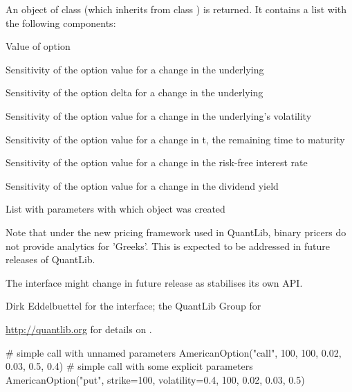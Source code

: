 \begin{Value}
An object of class  (which inherits from class
) is returned. It contains a list with the
following components: 
\begin{ldescription}
\item[\code{value}] Value of option
\item[\code{delta}] Sensitivity of the option value for a change in the underlying
\item[\code{gamma}] Sensitivity of the option delta for a change in the underlying
\item[\code{vega}] Sensitivity of the option value for a change in the
underlying's volatility
\item[\code{theta}] Sensitivity of the option value for a change in t, the
remaining time to maturity
\item[\code{rho}] Sensitivity of the option value for a change in the
risk-free interest rate
\item[\code{dividendRho}] Sensitivity of the option value for a change in the
dividend yield
\item[\code{parameters}] List with parameters with which object was created
\end{ldescription}


Note that under the new pricing framework used in QuantLib, binary
pricers do not provide analytics for 'Greeks'. This is expected to be
addressed in future releases of QuantLib.
\end{Value}
\begin{Note}\relax
The interface might change in future release as 
stabilises its own API.
\end{Note}
\begin{Author}\relax
Dirk Eddelbuettel  for the \R{} interface;
the QuantLib Group for 
\end{Author}
\begin{References}\relax
\url{http://quantlib.org} for details on .
\end{References}
\begin{SeeAlso}\relax
{}
\end{SeeAlso}
\begin{Examples}
\begin{ExampleCode}
# simple call with unnamed parameters
AmericanOption("call", 100, 100, 0.02, 0.03, 0.5, 0.4)
# simple call with some explicit parameters
AmericanOption("put", strike=100, volatility=0.4, 100, 0.02, 0.03, 0.5)
\end{ExampleCode}
\end{Examples}

